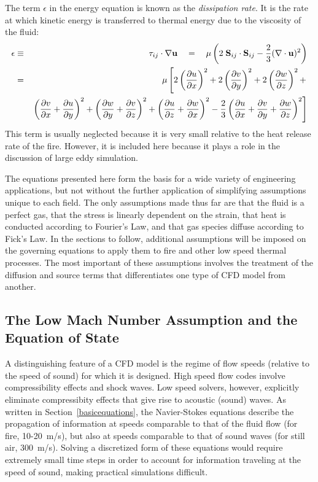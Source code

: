 \documentclass[11pt]{book}
\begin{document}
The term $\epsilon$ in the energy equation is known
as the {\em dissipation rate}. It is the rate at which kinetic energy is transferred to thermal energy due to the
viscosity of the fluid:
\begin{eqnarray}
\epsilon &\equiv& {\bf \tau}_{ij} \cdot \nabla {\bf u} \quad =  \quad
   \mu \left( 2 \; {\bf S}_{ij} \cdot {\bf S}_{ij}
                  - \frac{2}{3} (\nabla \cdot {\bf u})^2 \right) \\
  &=& \mu \left[ 2 \left(\frac{\partial u}{\partial x}\right)^2
 + 2 \left(\frac{\partial v}{\partial y}\right)^2 + 2 \left(\frac{\partial w}{\partial z}\right)^2 + \right. \\
& & \left.
  \left(\frac{\partial v}{\partial x}+\frac{\partial u}{\partial y}\right)^2 + \left(\frac{\partial w}{\partial y}+\frac{\partial v}{\partial z}\right)^2
 + \left(\frac{\partial u}{\partial z}+\frac{\partial w}{\partial x}\right)^2 - \frac{2}{3}
   \left(\frac{\partial u}{\partial x}+\frac{\partial v}{\partial y} + \frac{\partial w}{\partial z} \right)^2  \right]  \label{dissipation} \end{eqnarray}
This term is usually neglected because it is very small relative to the heat release rate of
the fire. However, it is included here because it plays a role in the discussion of large eddy simulation.

The equations presented here form the basis for a wide variety of engineering applications, but not without
the further application of simplifying assumptions unique to each field.
The only assumptions made thus far are that the fluid is a perfect gas, that the stress is
linearly dependent on the strain, that heat is conducted according to Fourier's Law, and that gas species diffuse according to
Fick's Law. In the sections to follow, additional assumptions will be
imposed on the governing equations to apply them to fire and other low speed thermal processes.
The most important of these assumptions involves the treatment of the diffusion and source
terms that differentiates one type of CFD model from
another.




\subsection{The Low Mach Number Assumption and the Equation of State}

A distinguishing feature of a CFD model is the regime of
flow speeds (relative to the speed of sound) for which it is designed. High
speed flow codes involve compressibility effects and shock waves. Low speed
solvers, however, explicitly eliminate compressibity effects that give rise
to acoustic (sound) waves. As written in Section~\ref{basicequations}, the Navier-Stokes equations describe the
propagation of information at speeds comparable to that of the fluid flow (for fire, 10-20~m/s),
but also at speeds comparable to that of sound waves (for still air,
300~m/s). Solving a discretized form of these equations would require extremely small
time steps in order to account for information traveling at the speed of sound, making
practical simulations difficult.
\end{document}
